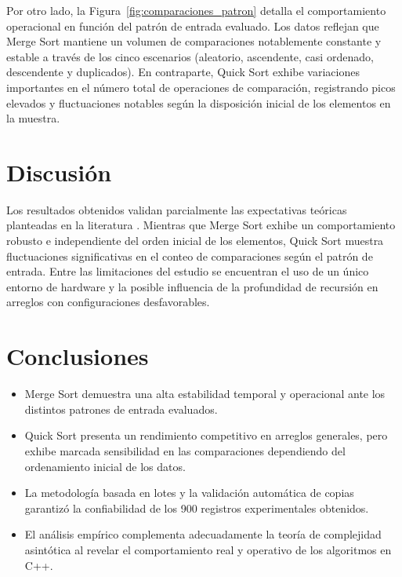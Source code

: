 Por otro lado, la Figura~\ref{fig:comparaciones_patron} detalla el comportamiento operacional en función del patrón de entrada evaluado. Los datos reflejan que Merge Sort mantiene un volumen de comparaciones notablemente constante y estable a través de los cinco escenarios (aleatorio, ascendente, casi ordenado, descendente y duplicados). En contraparte, Quick Sort exhibe variaciones importantes en el número total de operaciones de comparación, registrando picos elevados y fluctuaciones notables según la disposición inicial de los elementos en la muestra.

\section{Discusión}
Los resultados obtenidos validan parcialmente las expectativas teóricas planteadas en la literatura \parencite{cormen2022}. Mientras que Merge Sort exhibe un comportamiento robusto e independiente del orden inicial de los elementos, Quick Sort muestra fluctuaciones significativas en el conteo de comparaciones según el patrón de entrada. Entre las limitaciones del estudio se encuentran el uso de un único entorno de hardware y la posible influencia de la profundidad de recursión en arreglos con configuraciones desfavorables.

\section{Conclusiones}
\begin{itemize}
    \item Merge Sort demuestra una alta estabilidad temporal y operacional ante los distintos patrones de entrada evaluados.
    \item Quick Sort presenta un rendimiento competitivo en arreglos generales, pero exhibe marcada sensibilidad en las comparaciones dependiendo del ordenamiento inicial de los datos.
    \item La metodología basada en lotes y la validación automática de copias garantizó la confiabilidad de los 900 registros experimentales obtenidos.
    \item El análisis empírico complementa adecuadamente la teoría de complejidad asintótica al revelar el comportamiento real y operativo de los algoritmos en C++.
\end{itemize}

\onecolumn
\printbibliography[title={Referencias}]

